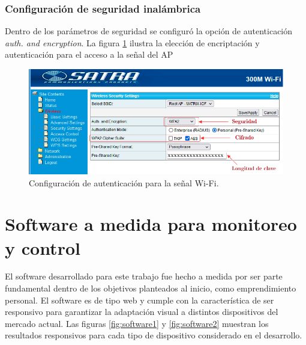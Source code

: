 \subsubsection{Configuración de seguridad inalámbrica}
Dentro de los parámetros de seguridad se configuró la opción de autenticación \emph{auth. and encryption}. La figura \ref{fig:encriptacion} ilustra la elección de encriptación y autenticación para el acceso a la señal del AP 

\vspace{0.5cm}
\begin{figure}[htpb]
\centering 
\includegraphics[width=1.0\textwidth]{./Figures/encriptacion.png}
\caption{Configuración de autenticación para la señal Wi-Fi.}
\label{fig:encriptacion}
\end{figure}

\section{Software a medida para monitoreo y control}

El software desarrollado para este trabajo fue hecho a medida por ser parte fundamental dentro de los objetivos planteados al inicio, como emprendimiento personal. El software es de tipo web y cumple con la característica de ser responsivo para garantizar la adaptación visual a distintos dispositivos del mercado actual. Las figuras \ref{fig:software1} y \ref{fig:software2} muestran los resultados responsivos para cada tipo de dispositivo considerado en el desarrollo.

